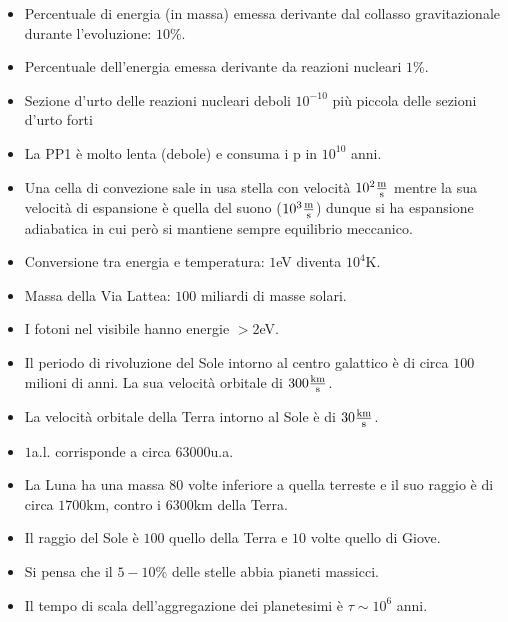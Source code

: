 \documentclass[11pt,a4paper]{article}
\begin{document}
\begin{itemize}
\item Percentuale di energia (in massa) emessa derivante dal collasso gravitazionale durante l'evoluzione: $10\%$.
\item Percentuale dell'energia emessa derivante da reazioni nucleari $1\%$.
\item Sezione d'urto delle reazioni nucleari deboli $10^{-10}$ più piccola delle sezioni d'urto forti
\item La PP1 è molto lenta (debole) e consuma i p in $10^{10}$ anni.
\item Una cella di convezione sale in usa stella con velocità $10^{2} \si{\frac{\meter}{\second}}$ mentre la sua velocità di espansione è quella del suono ($10^{3} \si{\frac{\meter}{\second}}$) dunque si ha espansione adiabatica in cui però si mantiene sempre equilibrio meccanico.
\item Conversione tra energia e temperatura: $1$eV diventa $10^{4} \si{\kelvin}$.
\item Massa della Via Lattea: $100$ miliardi di masse solari.
\item I fotoni nel visibile hanno energie $>2$eV.
\item Il periodo di rivoluzione del Sole intorno al centro galattico è di circa $100$ milioni di anni. La sua velocità orbitale di $300 \si{\frac{\kilo \m}{\s}}$.
\item La velocità orbitale della Terra intorno al Sole è di $30 \si{\frac{\kilo \meter}{\s}}$.
\item $1$a.l. corrisponde a circa $63000$u.a.
\item La Luna ha una massa $80$ volte inferiore a quella terreste e il suo raggio è di circa $1700 \si{\kilo \meter}$, contro i $6300 \si{\kilo \meter}$ della Terra.
\item Il raggio del Sole è $100$ quello della Terra e $10$ volte quello di Giove.
\item Si pensa che il $5-10\%$ delle stelle abbia pianeti massicci.
\item Il tempo di scala dell'aggregazione dei planetesimi è $\tau \sim 10^6$ anni.
\end{itemize}
\end{document}
